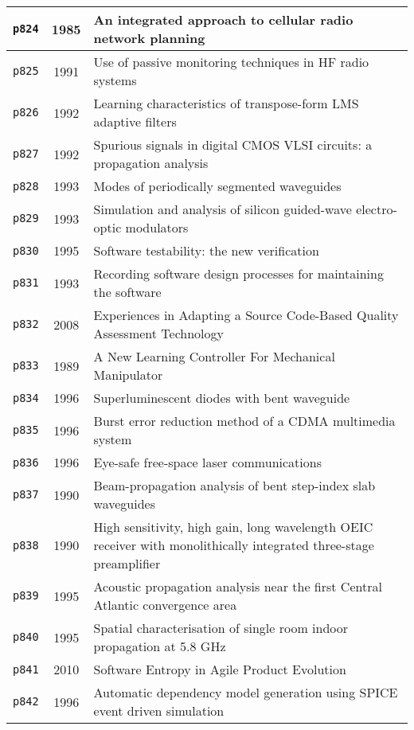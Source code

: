 \begin{longtable}{| c | c | p{16cm} |}
  \hline
  \texttt{p824} & 1985 & An integrated approach to cellular radio network planning \\
  \hline
  \texttt{p825} & 1991 & Use of passive monitoring techniques in HF radio systems \\
  \hline
  \texttt{p826} & 1992 & Learning characteristics of transpose-form LMS adaptive filters \\
  \hline
  \texttt{p827} & 1992 & Spurious signals in digital CMOS VLSI circuits: a propagation analysis \\
  \hline
  \texttt{p828} & 1993 & Modes of periodically segmented waveguides \\
  \hline
  \texttt{p829} & 1993 & Simulation and analysis of silicon guided-wave electro-optic modulators \\
  \hline
  \texttt{p830} & 1995 & Software testability: the new verification \\
  \hline
  \texttt{p831} & 1993 & Recording software design processes for maintaining the software \\
  \hline
  \texttt{p832} & 2008 & Experiences in Adapting a Source Code-Based Quality Assessment Technology \\
  \hline
  \texttt{p833} & 1989 & A New Learning Controller For Mechanical Manipulator \\
  \hline
  \texttt{p834} & 1996 & Superluminescent diodes with bent waveguide \\
  \hline
  \texttt{p835} & 1996 & Burst error reduction method of a CDMA multimedia system \\
  \hline
  \texttt{p836} & 1996 & Eye-safe free-space laser communications \\
  \hline
  \texttt{p837} & 1990 & Beam-propagation analysis of bent step-index slab waveguides \\
  \hline
  \texttt{p838} & 1990 & High sensitivity, high gain, long wavelength OEIC receiver with monolithically integrated three-stage preamplifier \\
  \hline
  \texttt{p839} & 1995 & Acoustic propagation analysis near the first Central Atlantic convergence area \\
  \hline
  \texttt{p840} & 1995 & Spatial characterisation of single room indoor propagation at 5.8 GHz \\
  \hline
  \texttt{p841} & 2010 & Software Entropy in Agile Product Evolution \\
  \hline
  \texttt{p842} & 1996 & Automatic dependency model generation using SPICE event driven simulation \\

\end{longtable}
